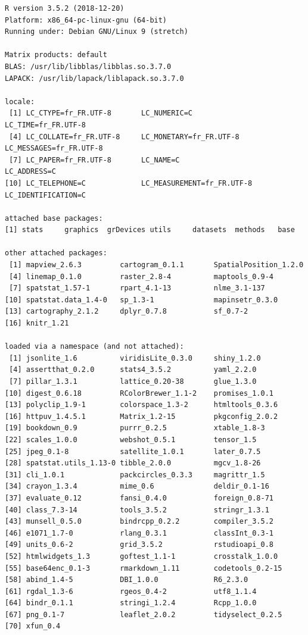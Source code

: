 \documentclass[]{book}
\begin{document}
\begin{verbatim}
R version 3.5.2 (2018-12-20)
Platform: x86_64-pc-linux-gnu (64-bit)
Running under: Debian GNU/Linux 9 (stretch)

Matrix products: default
BLAS: /usr/lib/libblas/libblas.so.3.7.0
LAPACK: /usr/lib/lapack/liblapack.so.3.7.0

locale:
 [1] LC_CTYPE=fr_FR.UTF-8       LC_NUMERIC=C               LC_TIME=fr_FR.UTF-8       
 [4] LC_COLLATE=fr_FR.UTF-8     LC_MONETARY=fr_FR.UTF-8    LC_MESSAGES=fr_FR.UTF-8   
 [7] LC_PAPER=fr_FR.UTF-8       LC_NAME=C                  LC_ADDRESS=C              
[10] LC_TELEPHONE=C             LC_MEASUREMENT=fr_FR.UTF-8 LC_IDENTIFICATION=C       

attached base packages:
[1] stats     graphics  grDevices utils     datasets  methods   base     

other attached packages:
 [1] mapview_2.6.3         cartogram_0.1.1       SpatialPosition_1.2.0
 [4] linemap_0.1.0         raster_2.8-4          maptools_0.9-4       
 [7] spatstat_1.57-1       rpart_4.1-13          nlme_3.1-137         
[10] spatstat.data_1.4-0   sp_1.3-1              mapinsetr_0.3.0      
[13] cartography_2.1.2     dplyr_0.7.8           sf_0.7-2             
[16] knitr_1.21           

loaded via a namespace (and not attached):
 [1] jsonlite_1.6          viridisLite_0.3.0     shiny_1.2.0          
 [4] assertthat_0.2.0      stats4_3.5.2          yaml_2.2.0           
 [7] pillar_1.3.1          lattice_0.20-38       glue_1.3.0           
[10] digest_0.6.18         RColorBrewer_1.1-2    promises_1.0.1       
[13] polyclip_1.9-1        colorspace_1.3-2      htmltools_0.3.6      
[16] httpuv_1.4.5.1        Matrix_1.2-15         pkgconfig_2.0.2      
[19] bookdown_0.9          purrr_0.2.5           xtable_1.8-3         
[22] scales_1.0.0          webshot_0.5.1         tensor_1.5           
[25] jpeg_0.1-8            satellite_1.0.1       later_0.7.5          
[28] spatstat.utils_1.13-0 tibble_2.0.0          mgcv_1.8-26          
[31] cli_1.0.1             packcircles_0.3.3     magrittr_1.5         
[34] crayon_1.3.4          mime_0.6              deldir_0.1-16        
[37] evaluate_0.12         fansi_0.4.0           foreign_0.8-71       
[40] class_7.3-14          tools_3.5.2           stringr_1.3.1        
[43] munsell_0.5.0         bindrcpp_0.2.2        compiler_3.5.2       
[46] e1071_1.7-0           rlang_0.3.1           classInt_0.3-1       
[49] units_0.6-2           grid_3.5.2            rstudioapi_0.8       
[52] htmlwidgets_1.3       goftest_1.1-1         crosstalk_1.0.0      
[55] base64enc_0.1-3       rmarkdown_1.11        codetools_0.2-15     
[58] abind_1.4-5           DBI_1.0.0             R6_2.3.0             
[61] rgdal_1.3-6           rgeos_0.4-2           utf8_1.1.4           
[64] bindr_0.1.1           stringi_1.2.4         Rcpp_1.0.0           
[67] png_0.1-7             leaflet_2.0.2         tidyselect_0.2.5     
[70] xfun_0.4             
\end{verbatim}


\end{document}
